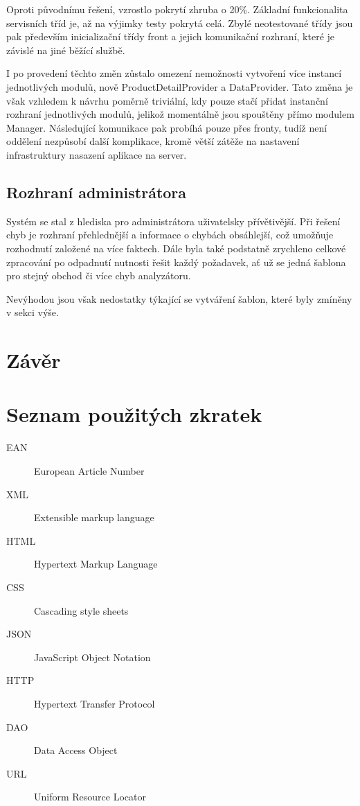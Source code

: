 \documentclass[thesis=B,czech]{FITthesis}[2012/06/26]
\begin{document}
Oproti původnímu řešení, vzrostlo pokrytí zhruba o 20\%. Základní funkcionalita servisních tříd je, až na výjimky testy pokrytá celá.
Zbylé neotestované třídy jsou pak především inicializační třídy front a jejich komunikační rozhraní, které je závislé na jiné běžící službě.
\par
I po provedení těchto změn zůstalo omezení nemožnosti vytvoření více instancí jednotlivých modulů, nově ProductDetailProvider a DataProvider.
Tato změna je však vzhledem k návrhu poměrně triviální, kdy pouze stačí přidat instanční rozhraní jednotlivých modulů, jelikož 
momentálně jsou spouštěny přímo modulem Manager. Následující komunikace pak probíhá pouze přes fronty, tudíž není oddělení nezpůsobí
další komplikace, kromě větší zátěže na nastavení infrastruktury nasazení aplikace na server.

\section{Rozhraní administrátora}
Systém se stal z hlediska pro administrátora uživatelsky přívětivější. Při řešení chyb je rozhraní přehlednější a informace o chybách
obsáhlejší, což umožňuje rozhodnutí založené na více faktech. Dále byla také podstatně zrychleno celkové zpracování po odpadnutí nutnosti řešit
každý požadavek, ať už se jedná šablona pro stejný obchod či více chyb analyzátoru.
\par
Nevýhodou jsou však nedostatky týkající se vytváření šablon, které byly zmíněny v sekci výše.
\chapter{Závěr}









\appendix
\chapter{Seznam použitých zkratek}
\begin{description}
	\item[EAN] European Article Number
	\item[XML] Extensible markup language
	\item[HTML] Hypertext Markup Language
	\item[CSS] Cascading style sheets
	\item[JSON] JavaScript Object Notation
	\item[HTTP] Hypertext Transfer Protocol
	\item[DAO] Data Access Object
	\item[URL] Uniform Resource Locator

\end{description}
\end{document}
